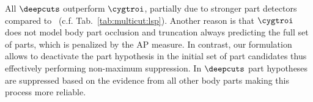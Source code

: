 All $\deepcuts$ outperform $\cygtroi$, partially due to stronger part
detectors compared to~\cite{chen14nips}
(c.f. Tab.~\ref{tab:multicut:lsp}). Another reason is that $\cygtroi$
does not model body part occlusion and truncation always predicting
the full set of parts, which is penalized by the AP measure. In
contrast, our formulation allows to deactivate the part hypothesis in
the initial set of part candidates thus effectively performing
non-maximum suppression. In $\deepcuts$ part hypotheses are suppressed
based on the evidence from all other body parts making this process
more reliable.


%

%
%
%
%
%
%
%
